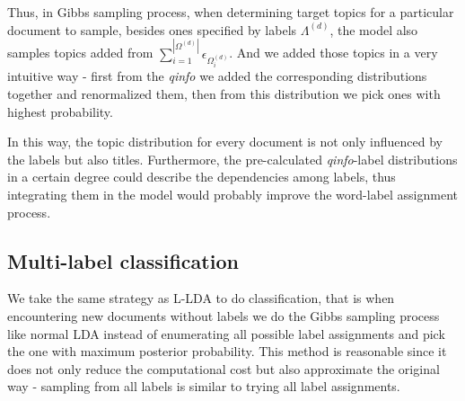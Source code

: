 Thus, in Gibbs sampling process, when determining target topics for a particular document to sample, besides ones specified by labels $\Lambda^{(d)}$, the model also samples topics added from $\sum_{i=1}^{|\Omega^{(d)}|}{\epsilon_{\Omega_i^{(d)}}}$. And we added those topics in a very intuitive way - first from the \emph{qinfo} we added the corresponding distributions together and renormalized them, then from this distribution we pick ones with highest probability. 

In this way, the topic distribution for every document is not only influenced by the labels but also titles. Furthermore, the pre-calculated \emph{qinfo}-label distributions in a certain degree could describe the dependencies among labels, thus integrating them in the model would probably improve the word-label assignment process.

\subsection{Multi-label classification}

We take the same strategy as L-LDA to do classification, that is when encountering new documents without labels we do the Gibbs sampling process like normal LDA instead of enumerating all possible label assignments and pick the one with maximum posterior probability. This method is reasonable since it does not only reduce the computational cost but also approximate the original way - sampling from all labels is similar to trying all label assignments.